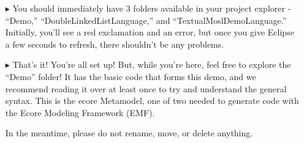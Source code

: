 \newpage
\texHeader
{}


\begin{itemize}
\FloatBarrier
\item[$\blacktriangleright$] You\hypertarget{simpleDemo tex}{} should immediately have 3 folders available in your project explorer - ``Demo,'' ``DoubleLinkedListLanguage,'' and ``TextualMoslDemoLanguage.'' Initially, you'll see a red exclamation and an error, but once you give Eclipse a few seconds to refresh, there shouldn't be any problems.

\item[$\blacktriangleright$] That's it! You're all set up! But, while you're here, feel free to explore the ``Demo'' folder! It has the basic code that forms this demo, and we recommend reading it over at least once to try and understand the general syntax. This is the ecore Metamodel, one of two needed to generate code with the Ecore Modeling Framework (EMF).

In the meantime, please do not rename, move, or delete anything.
\end{itemize}